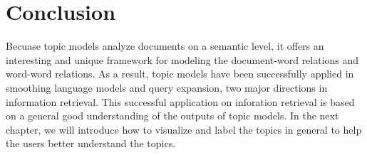 \section{Conclusion}

Becuase topic models analyze documents on a semantic level, it offers an interesting and unique framework for modeling the document-word relations and word-word relations. As a result, topic models have been successfully applied in smoothing language models and query expansion, two major directions in information retrieval. This successful application on inforation retrieval is based on a general good understanding of the outputs of topic models. In the next chapter, we will introduce how to visualize  and label the topics in general to help the users better understand the topics.







